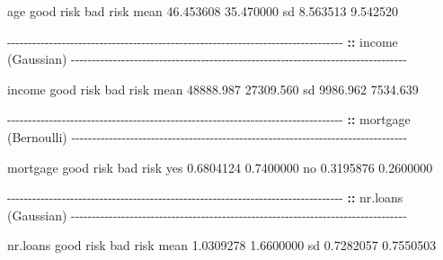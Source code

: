 \documentclass[
  11pt,
]{book}
\makeatletter
\newenvironment{Shaded}{}{}
\newcommand{\ErrorTok}[1]{\textcolor[rgb]{0.21,0.21,0.21}{\textbf{#1}}}
\newcommand{\FloatTok}[1]{#1}
\newcommand{\FunctionTok}[1]{#1}
\newcommand{\NormalTok}[1]{#1}
\newcommand{\SpecialCharTok}[1]{\textcolor[rgb]{0.39,0.39,0.39}{#1}}
\newenvironment{kframe}{%
\medskip{}
\setlength{\fboxsep}{.8em}
 \def\at@end@of@kframe{}%
 \ifinner\ifhmode%
  \def\at@end@of@kframe{\end{minipage}}%
  \begin{minipage}{\columnwidth}%
 \fi\fi%
 \def\FrameCommand##1{\hskip\@totalleftmargin \hskip-\fboxsep
 \colorbox{shadecolor}{##1}\hskip-\fboxsep
     \hskip-\linewidth \hskip-\@totalleftmargin \hskip\columnwidth}%
 \MakeFramed {\advance\hsize-\width
   \@totalleftmargin\z@ \linewidth\hsize
   \@setminipage}}%
 {\par\unskip\endMakeFramed%
 \at@end@of@kframe}
\renewenvironment{Shaded}{\begin{kframe}}{\end{kframe}}
\theoremstyle{definition}
\theoremstyle{definition}
\theoremstyle{definition}
\theoremstyle{definition}
\theoremstyle{remark}
\makeatother
\begin{document}
\begin{Shaded}
\begin{Highlighting}[]
\NormalTok{   age    good risk  bad risk}
\NormalTok{     mean }\FloatTok{46.453608} \FloatTok{35.470000}
\NormalTok{     sd    }\FloatTok{8.563513}  \FloatTok{9.542520}
   
   \SpecialCharTok{{-}{-}{-}{-}{-}{-}{-}{-}{-}{-}{-}{-}{-}{-}{-}{-}{-}{-}{-}{-}{-}{-}{-}{-}{-}{-}{-}{-}{-}{-}{-}{-}{-}{-}{-}{-}{-}{-}{-}{-}{-}{-}{-}{-}{-}{-}{-}{-}{-}{-}{-}{-}{-}{-}{-}{-}{-}{-}{-}{-}{-}{-}{-}{-}{-}{-}{-}{-}{-}{-}{-}{-}{-}{-}{-}{-}{-}{-}{-}{-}} 
   \ErrorTok{::} \FunctionTok{income}\NormalTok{ (Gaussian) }
   \SpecialCharTok{{-}{-}{-}{-}{-}{-}{-}{-}{-}{-}{-}{-}{-}{-}{-}{-}{-}{-}{-}{-}{-}{-}{-}{-}{-}{-}{-}{-}{-}{-}{-}{-}{-}{-}{-}{-}{-}{-}{-}{-}{-}{-}{-}{-}{-}{-}{-}{-}{-}{-}{-}{-}{-}{-}{-}{-}{-}{-}{-}{-}{-}{-}{-}{-}{-}{-}{-}{-}{-}{-}{-}{-}{-}{-}{-}{-}{-}{-}{-}{-}} 
         
\NormalTok{   income good risk  bad risk}
\NormalTok{     mean }\FloatTok{48888.987} \FloatTok{27309.560}
\NormalTok{     sd    }\FloatTok{9986.962}  \FloatTok{7534.639}
   
   \SpecialCharTok{{-}{-}{-}{-}{-}{-}{-}{-}{-}{-}{-}{-}{-}{-}{-}{-}{-}{-}{-}{-}{-}{-}{-}{-}{-}{-}{-}{-}{-}{-}{-}{-}{-}{-}{-}{-}{-}{-}{-}{-}{-}{-}{-}{-}{-}{-}{-}{-}{-}{-}{-}{-}{-}{-}{-}{-}{-}{-}{-}{-}{-}{-}{-}{-}{-}{-}{-}{-}{-}{-}{-}{-}{-}{-}{-}{-}{-}{-}{-}{-}} 
   \ErrorTok{::} \FunctionTok{mortgage}\NormalTok{ (Bernoulli) }
   \SpecialCharTok{{-}{-}{-}{-}{-}{-}{-}{-}{-}{-}{-}{-}{-}{-}{-}{-}{-}{-}{-}{-}{-}{-}{-}{-}{-}{-}{-}{-}{-}{-}{-}{-}{-}{-}{-}{-}{-}{-}{-}{-}{-}{-}{-}{-}{-}{-}{-}{-}{-}{-}{-}{-}{-}{-}{-}{-}{-}{-}{-}{-}{-}{-}{-}{-}{-}{-}{-}{-}{-}{-}{-}{-}{-}{-}{-}{-}{-}{-}{-}{-}} 
           
\NormalTok{   mortgage good risk  bad risk}
\NormalTok{        yes }\FloatTok{0.6804124} \FloatTok{0.7400000}
\NormalTok{        no  }\FloatTok{0.3195876} \FloatTok{0.2600000}
   
   \SpecialCharTok{{-}{-}{-}{-}{-}{-}{-}{-}{-}{-}{-}{-}{-}{-}{-}{-}{-}{-}{-}{-}{-}{-}{-}{-}{-}{-}{-}{-}{-}{-}{-}{-}{-}{-}{-}{-}{-}{-}{-}{-}{-}{-}{-}{-}{-}{-}{-}{-}{-}{-}{-}{-}{-}{-}{-}{-}{-}{-}{-}{-}{-}{-}{-}{-}{-}{-}{-}{-}{-}{-}{-}{-}{-}{-}{-}{-}{-}{-}{-}{-}} 
   \ErrorTok{::} \FunctionTok{nr.loans}\NormalTok{ (Gaussian) }
   \SpecialCharTok{{-}{-}{-}{-}{-}{-}{-}{-}{-}{-}{-}{-}{-}{-}{-}{-}{-}{-}{-}{-}{-}{-}{-}{-}{-}{-}{-}{-}{-}{-}{-}{-}{-}{-}{-}{-}{-}{-}{-}{-}{-}{-}{-}{-}{-}{-}{-}{-}{-}{-}{-}{-}{-}{-}{-}{-}{-}{-}{-}{-}{-}{-}{-}{-}{-}{-}{-}{-}{-}{-}{-}{-}{-}{-}{-}{-}{-}{-}{-}{-}} 
           
\NormalTok{   nr.loans good risk  bad risk}
\NormalTok{       mean }\FloatTok{1.0309278} \FloatTok{1.6600000}
\NormalTok{       sd   }\FloatTok{0.7282057} \FloatTok{0.7550503}
   

\end{Highlighting}
\end{Shaded}
\end{document}
